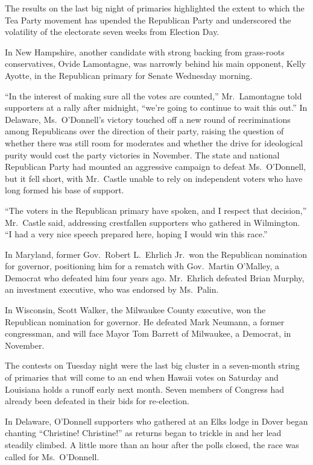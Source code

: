 ﻿\documentclass[12pt]{article}
\begin{document}
The results on the last big night of primaries highlighted the extent to which the Tea Party
movement has upended the Republican Party and underscored the volatility of the electorate seven
weeks from Election Day.

In New Hampshire, another candidate with strong backing from grass-roots conservatives, Ovide
Lamontagne, was narrowly behind his main opponent, Kelly Ayotte, in the Republican primary for
Senate Wednesday morning.

``In the interest of making sure all the votes are counted,'' Mr.~Lamontagne told supporters at a
rally after midnight, ``we're going to continue to wait this out.'' In Delaware, Ms.~O'Donnell's
victory touched off a new round of recriminations among Republicans over the direction of their
party, raising the question of whether there was still room for moderates and whether the drive for
ideological purity would cost the party victories in November. The state and national Republican
Party had mounted an aggressive campaign to defeat Ms.~O'Donnell, but it fell short, with Mr.~Castle
unable to rely on independent voters who have long formed his base of support.

``The voters in the Republican primary have spoken, and I respect that decision,'' Mr.~Castle said,
addressing crestfallen supporters who gathered in Wilmington. ``I had a very nice speech prepared
here, hoping I would win this race.''

In Maryland, former Gov.~Robert L.~Ehrlich Jr.~won the Republican nomination for governor,
positioning him for a rematch with Gov.~Martin O'Malley, a Democrat who defeated him four years ago.
Mr.~Ehrlich defeated Brian Murphy, an investment executive, who was endorsed by Ms.~Palin.

In Wisconsin, Scott Walker, the Milwaukee County executive, won the Republican nomination for
governor. He defeated Mark Neumann, a former congressman, and will face Mayor Tom Barrett of
Milwaukee, a Democrat, in November.

The contests on Tuesday night were the last big cluster in a seven-month string of primaries that
will come to an end when Hawaii votes on Saturday and Louisiana holds a runoff early next month.
Seven members of Congress had already been defeated in their bids for re-election.

In Delaware, O'Donnell supporters who gathered at an Elks lodge in Dover began chanting ``Christine!
Christine!'' as returns began to trickle in and her lead steadily climbed. A little more than an
hour after the polls closed, the race was called for Ms.~O'Donnell.
\end{document}

